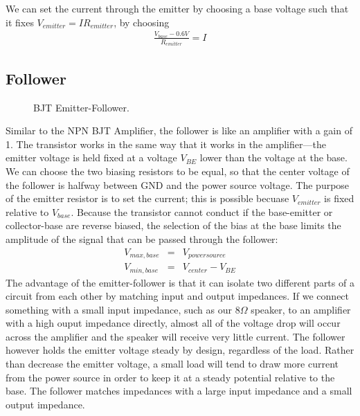 \documentclass[12pt]{article}
\begin{document}
We can set the current through the emitter by choosing a base voltage such that it fixes $V_{emitter} = IR_{emitter}$, by choosing
\begin{eqnarray}
 \frac{V_{base} - 0.6V}{R_{emitter}} = I \label{eq:setcurrent}
\end{eqnarray}

\subsection*{Follower}
\begin{figure}[H]
\caption{BJT Emitter-Follower.}
\label{fig:follwer_diagram}
\end{figure}
Similar to the NPN BJT Amplifier, the follower is like an amplifier with a gain of 1. The transistor works in the same way that it works in the amplifier---the emitter voltage is held fixed at a voltage $V_{BE}$ lower than the voltage at the base. We can choose the two biasing resistors to be equal, so that the center voltage of the follower is halfway between GND and the power source voltage. The purpose of the emitter resistor is to set the current; this is possible becuase $V_{emitter}$ is fixed relative to $V_{base}$. Because the transistor cannot conduct if the base-emitter or collector-base are reverse biased, the selection of the bias at the base limits the amplitude of the signal that can be passed through the follower:
\begin{eqnarray}
V_{max,base} &=&V_{powersource}\label{eq:maxbase}\\
V_{min,base} &=& V_{center} - V_{BE}\label{eq:minbase}
\end{eqnarray}
The advantage of the emitter-follower is that it can isolate two different parts of a circuit from each other by matching input and output impedances. If we connect something with a small input impedance, such as our $8\Omega$ speaker, to an amplifier with a high ouput impedance directly, almost all of the voltage drop will occur across the amplifier and the speaker will receive very little current. The follower however holds the emitter voltage steady by design, regardless of the load. Rather than decrease the emitter voltage, a small load will tend to draw more current from the power source in order to keep it at a steady potential relative to the base. The follower matches impedances with a large input impedance and a small output impedance.
\end{document}

